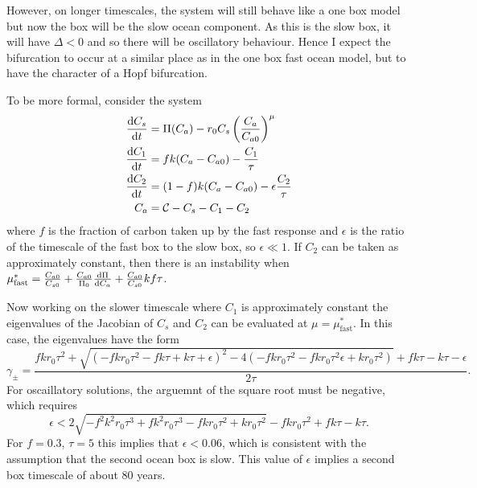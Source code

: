However, on longer timescales, the system will still behave like a one box model but now the box will be the slow ocean component. As this is the slow box,
it will have $\Delta < 0$ and so there will be oscillatory behaviour. Hence I expect the bifurcation to occur at a similar place as in the one box fast ocean model,
but to have the character of a Hopf bifurcation.

To be more formal, consider the system
\begin{subequations}
  \begin{align}
    \label{eq:two_box_ocean}
    \dv{C_s}{t} &= \Pi(C_a) - r_0 C_s \left(\frac{C_a}{C_{a0}}\right)^{\mu} \\
    \dv{C_1}{t} &= fk(C_a - C_{a0}) - \frac{C_1}{\tau} \\
    \dv{C_2}{t} &= (1-f)k(C_a-C_{a0}) - \epsilon\frac{C_2}{\tau} \\
    C_a &= \mathcal{C} - C_s - C_1 - C_2
  \end{align}
\end{subequations}
where $f$ is the fraction of carbon taken up by the fast response and $\epsilon$ is the ratio of the timescale of the fast box to the slow box, so $\epsilon \ll 1$. If
$C_2$ can be taken as approximately constant, then there is an instability when $\mu^*_{\mathrm{fast}} = \frac{C_{a0}}{C_{s0}} + \frac{C_{a0}}{\Pi_0} \dv{\Pi}{C_a} + \frac{C_{a0}}{C_{s0}} kf\tau$.

Now working on the slower timescale where $C_1$ is approximately constant the eigenvalues of the Jacobian of $C_s$ and $C_2$ can be evaluated at $\mu = \mu^*_{\mathrm{fast}}$. In this case, the eigenvalues
have the form
\begin{equation}
  \label{eq:slow_eigenvalues}
  \gamma_{\pm} = \frac{f k r_0 \tau ^2+\sqrt{\left(-f k r_0 \tau ^2-f k \tau +k \tau +\epsilon \right)^2-4 \left(-f k r_0 \tau ^2-f k r_0 \tau ^2 \epsilon +k r_0 \tau ^2\right)}+f k \tau -k \tau -\epsilon }
  {2 \tau }.
\end{equation}
For oscaillatory solutions, the arguemnt of the square root must be negative, which requires
\begin{equation}
  \label{eq:epsilon_requirement}
  \epsilon < 2 \sqrt{-f^2 k^2 r_0 \tau ^3+f k^2 r_0 \tau ^3-f k r_0 \tau ^2+k r_0 \tau ^2}-f k r_0 \tau ^2+f k \tau -k \tau.
\end{equation}
For $f = 0.3$, $\tau = 5$ this implies that $\epsilon < 0.06$, which is consistent with the assumption that the second ocean box is slow. This value of $\epsilon$ implies a second box timescale
of about 80 years.

